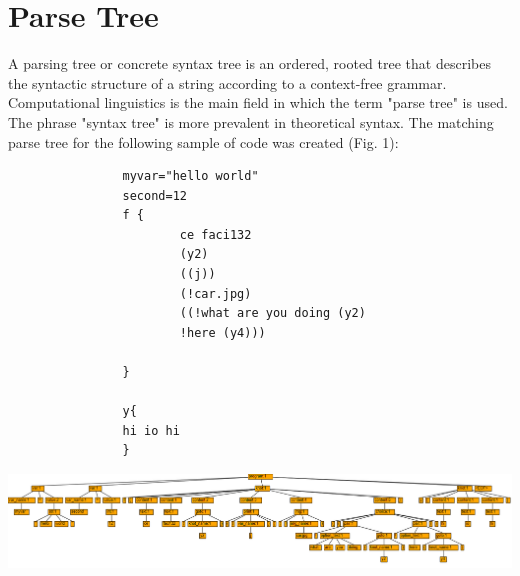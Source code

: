 \section{Parse Tree}
        A parsing tree or concrete syntax tree is an ordered, rooted tree that describes the syntactic structure of a string according to a context-free grammar. Computational linguistics is the main field in which the term "parse tree" is used. 
        The phrase "syntax tree" is more prevalent in theoretical syntax. The matching parse tree for the following sample of code was created (Fig. 1):
        
        \begin{verbatim}
                myvar="hello world"
                second=12
                f {
                        ce faci132
                        (y2)
                        ((j))
                        (!car.jpg)
                        ((!what are you doing (y2)
                        !here (y4)))
                    
                }
                
                y{
                hi io hi
                }     
        \end{verbatim}
        
        { \centering \includegraphics[width=\textwidth]{images/parsetree.png} }